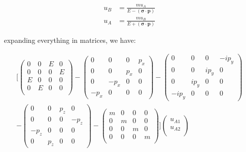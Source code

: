 \documentclass[11pt]{article}
\theoremstyle{definition}
\begin{document}
\begin{equation}
    \boxed{
    \begin{aligned}
    u_B &= \frac{m u_A}{E-\mathbf{(\sigma \cdot p)}}\\
    u_A &= \frac{m u_B}{E + \mathbf{(\sigma \cdot p)}}
    \end{aligned}
    }
\end{equation}

expanding everything in matrices, we have:

\begin{align}\biggl[
    \begin{pmatrix}
        0 & 0 & E & 0\\
        0 & 0 & 0 & E\\
        E & 0 & 0 & 0\\
        0 & E & 0 & 0\\
    \end{pmatrix}
    -
    \begin{pmatrix}
        0 & 0 & 0 & p_x\\    
        0 & 0 & p_x & 0\\    
        0 & -p_x & 0 & 0\\    
        -p_x & 0 & 0 & 0
    \end{pmatrix}
    -
    \begin{pmatrix}
        0 & 0 & 0 & -ip_y\\     
        0 & 0 & ip_y & 0\\     
        0 & ip_y & 0 & 0\\     
        -ip_y & 0 & 0 & 0
    \end{pmatrix}\\
    -
    \begin{pmatrix}
        0 & 0 & p_z & 0\\      
        0 & 0 & 0 & -p_z\\      
        -p_z & 0 & 0 & 0 \\      
        0 & p_z & 0 & 0
    \end{pmatrix}
    -
    \begin{pmatrix}
        m & 0 & 0 & 0\\
        0 & m & 0 & 0\\
        0 & 0 & m & 0\\
        0 & 0 & 0 & m\\
    \end{pmatrix}
\biggr]
\begin{pmatrix}
    u_{A1}\\
    u_{A2}\\

\end{pmatrix}
\end{align}
\end{document}
